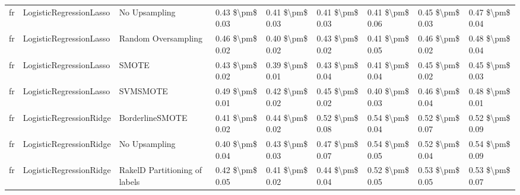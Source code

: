 \begin{tabular}{lllllllll}
      fr &         LogisticRegressionLasso &                 No Upsampling & 0.43 \$\textbackslash pm\$ 0.03 &           0.41 \$\textbackslash pm\$ 0.03 &       0.41 \$\textbackslash pm\$ 0.03 &        0.41 \$\textbackslash pm\$ 0.06 &                         0.45 \$\textbackslash pm\$ 0.03 &     0.47 \$\textbackslash pm\$ 0.04 \\
      fr &         LogisticRegressionLasso &           Random Oversampling & 0.46 \$\textbackslash pm\$ 0.02 &           0.40 \$\textbackslash pm\$ 0.02 &       0.43 \$\textbackslash pm\$ 0.02 &        0.41 \$\textbackslash pm\$ 0.05 &                         0.46 \$\textbackslash pm\$ 0.02 &     0.48 \$\textbackslash pm\$ 0.04 \\
      fr &         LogisticRegressionLasso &                         SMOTE & 0.43 \$\textbackslash pm\$ 0.02 &           0.39 \$\textbackslash pm\$ 0.01 &       0.43 \$\textbackslash pm\$ 0.04 &        0.41 \$\textbackslash pm\$ 0.04 &                         0.45 \$\textbackslash pm\$ 0.02 &     0.45 \$\textbackslash pm\$ 0.03 \\
      fr &         LogisticRegressionLasso &                      SVMSMOTE & 0.49 \$\textbackslash pm\$ 0.01 &           0.42 \$\textbackslash pm\$ 0.02 &       0.45 \$\textbackslash pm\$ 0.02 &        0.40 \$\textbackslash pm\$ 0.03 &                         0.46 \$\textbackslash pm\$ 0.04 &     0.48 \$\textbackslash pm\$ 0.01 \\
      fr &         LogisticRegressionRidge &               BorderlineSMOTE & 0.41 \$\textbackslash pm\$ 0.02 &           0.44 \$\textbackslash pm\$ 0.02 &       0.52 \$\textbackslash pm\$ 0.08 &        0.54 \$\textbackslash pm\$ 0.04 &                         0.52 \$\textbackslash pm\$ 0.07 &     0.52 \$\textbackslash pm\$ 0.09 \\
      fr &         LogisticRegressionRidge &                 No Upsampling & 0.40 \$\textbackslash pm\$ 0.04 &           0.43 \$\textbackslash pm\$ 0.03 &       0.47 \$\textbackslash pm\$ 0.07 &        0.54 \$\textbackslash pm\$ 0.05 &                         0.52 \$\textbackslash pm\$ 0.04 &     0.54 \$\textbackslash pm\$ 0.09 \\
      fr &         LogisticRegressionRidge & RakelD Partitioning of labels & 0.42 \$\textbackslash pm\$ 0.05 &           0.41 \$\textbackslash pm\$ 0.02 &       0.44 \$\textbackslash pm\$ 0.04 &        0.52 \$\textbackslash pm\$ 0.05 &                         0.53 \$\textbackslash pm\$ 0.05 &     0.53 \$\textbackslash pm\$ 0.07 \\

\end{tabular}
